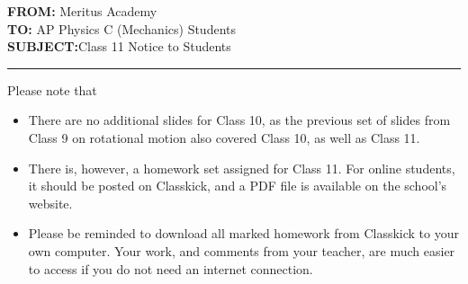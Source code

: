 \documentclass[letterpaper,11pt]{article}
\begin{document}
\textbf{FROM:}\tabto{1.3in} Meritus Academy\\
\textbf{TO:}\tabto{1.3in} AP Physics C (Mechanics) Students\\
\textbf{SUBJECT:}\tabto{1.3in}Class 11 Notice to Students

\vspace{.2in}\hrule

Please note that

\begin{itemize}[itemsep=4pt,topsep=0pt,leftmargin=15pt]
\item There are no additional slides for Class 10, as the previous set of
  slides from Class 9 on rotational motion also covered Class 10, as well as
  Class 11.

\item There is, however, a homework set assigned for Class 11. For online
  students, it should be posted on Classkick, and a PDF file is available on
  the school's website.

\item Please be reminded to download all marked homework from Classkick to your
  own computer. Your work, and comments from your teacher, are much easier to
  access if you do not need an internet connection.
\end{itemize}
\end{document}
